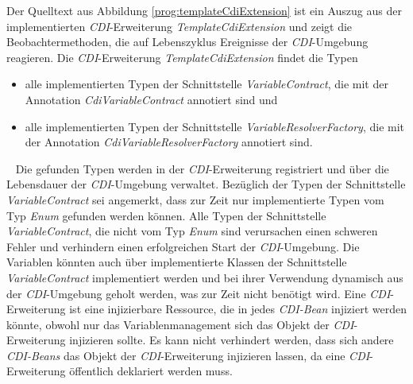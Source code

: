 \newline
\newline
Der Quelltext aus Abbildung \ref{prog:templateCdiExtension} ist ein Auszug aus der implementierten \emph{CDI}-Erweiterung \emph{TemplateCdiExtension} und zeigt die Beobachtermethoden, die auf Lebenszyklus Ereignisse der \emph{CDI}-Umgebung reagieren. Die  \emph{CDI}-Erweiterung \emph{TemplateCdiExtension} findet die Typen
\begin{itemize}
	\item alle implementierten Typen der Schnittstelle \emph{VariableContract}, die mit der Annotation \emph{CdiVariableContract} annotiert sind und
	\item alle implementierten Typen der Schnittstelle \emph{VariableResolverFactory}, die mit der Annotation \emph{CdiVariableResolverFactory} annotiert sind.
\end{itemize}
\ \newline
Die gefunden Typen werden in der \emph{CDI}-Erweiterung registriert und über die Lebensdauer der \emph{CDI}-Umgebung verwaltet. Bezüglich der Typen der Schnittstelle \emph{VariableContract} sei angemerkt, dass zur Zeit nur implementierte Typen vom Typ \emph{Enum} gefunden werden können. Alle Typen der Schnittstelle \emph{VariableContract}, die nicht vom Typ \emph{Enum} sind verursachen einen schweren Fehler und verhindern einen erfolgreichen Start der \emph{CDI}-Umgebung. Die Variablen könnten auch über implementierte Klassen der Schnittstelle \emph{VariableContract} implementiert werden und bei ihrer Verwendung dynamisch aus der \emph{CDI}-Umgebung geholt werden, was zur Zeit nicht benötigt wird.
\newline
\newline
Eine \emph{CDI}-Erweiterung ist eine injizierbare Ressource, die in jedes \emph{CDI-Bean} injiziert werden könnte, obwohl nur das Variablenmanagement sich das Objekt der \emph{CDI}-Erweiterung injizieren sollte. Es kann nicht verhindert werden, dass sich andere \emph{CDI-Beans} das Objekt der \emph{CDI}-Erweiterung injizieren lassen, da eine \emph{CDI}-Erweiterung öffentlich deklariert werden muss.

